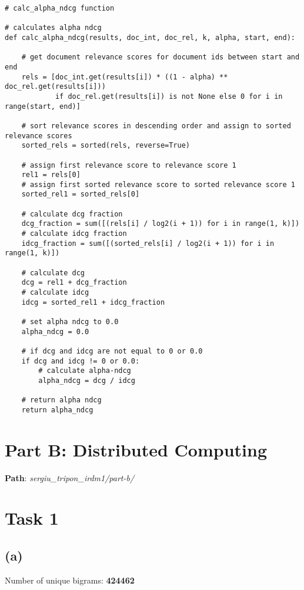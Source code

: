 \documentclass{article} %
\begin{document}
\begin{lstlisting}[style=Python]
# calc_alpha_ndcg function

# calculates alpha ndcg
def calc_alpha_ndcg(results, doc_int, doc_rel, k, alpha, start, end):

    # get document relevance scores for document ids between start and end
    rels = [doc_int.get(results[i]) * ((1 - alpha) ** doc_rel.get(results[i]))
            if doc_rel.get(results[i]) is not None else 0 for i in range(start, end)]

    # sort relevance scores in descending order and assign to sorted relevance scores
    sorted_rels = sorted(rels, reverse=True)

    # assign first relevance score to relevance score 1
    rel1 = rels[0]
    # assign first sorted relevance score to sorted relevance score 1
    sorted_rel1 = sorted_rels[0]

    # calculate dcg fraction
    dcg_fraction = sum([(rels[i] / log2(i + 1)) for i in range(1, k)])
    # calculate idcg fraction
    idcg_fraction = sum([(sorted_rels[i] / log2(i + 1)) for i in range(1, k)])

    # calculate dcg
    dcg = rel1 + dcg_fraction
    # calculate idcg
    idcg = sorted_rel1 + idcg_fraction

    # set alpha ndcg to 0.0
    alpha_ndcg = 0.0

    # if dcg and idcg are not equal to 0 or 0.0
    if dcg and idcg != 0 or 0.0:
        # calculate alpha-ndcg
        alpha_ndcg = dcg / idcg

    # return alpha ndcg
    return alpha_ndcg
\end{lstlisting}

\section*{Part B: Distributed Computing}

\textbf{Path}: \textit{sergiu\_tripon\_irdm1/part-b/}

\section*{Task 1}

\subsection*{(a)}

Number of unique bigrams: \textbf{424462}
\end{document}

